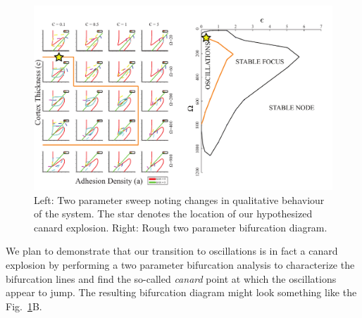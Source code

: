 \begin{figure}[h]
\centering
\captionsetup{width=\linewidth}
\includegraphics[width=7in]{Project2/figs/bifurcationdiagrams.pdf}
\caption{Left: Two parameter sweep noting changes in qualitative behaviour of the system. The star denotes the location of our hypothesized canard explosion. Right: Rough two parameter bifurcation diagram.}
\label{fig::epsomega}
\end{figure}
 
We plan to demonstrate that our transition to oscillations is in fact a canard explosion by performing a two parameter bifurcation analysis to characterize the bifurcation lines and find the so-called {\textit{canard}} point at which the oscillations appear to jump. The resulting bifurcation diagram might look something like the Fig.~\ref{fig::epsomega}B. 


